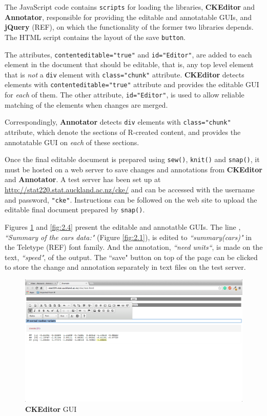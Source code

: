 \documentclass[a4paper, 12pt]{report}
\begin{document}
The JavaScript code contains \texttt{scripts} for loading the libraries, \textbf{CKEditor} and \textbf{Annotator}, responsible for providing the editable and annotatable GUIs, and \textbf{jQuery} (REF), on which the functionality of the former two libraries depends. The HTML script contains the layout of the save \texttt{button}.

The attributes, \texttt{contenteditable="true"} and \texttt{id="Editor"}, are added to each element in the document that should be editable, that is, any top level element that is \emph{not} a \texttt{div} element with \texttt{class="chunk"} attribute. \textbf{CKEditor} detects elements with \texttt{contenteditable="true"} attribute and provides the editable GUI for \emph{each} of them. The other attribute, \texttt{id="Editor"}, is used to allow reliable matching of the elements when changes are merged.

Correspondingly, \textbf{Annotator} detects \texttt{div} elements with \texttt{class="chunk"} attribute, which denote the sections of R-created content, and provides the annotatable GUI on \emph{each} of these sections.

Once the final editable document is prepared using \texttt{sew()}, \texttt{knit()} and \texttt{snap()}, it must be hosted on a web server to save changes and annotations from \textbf{CKEditor} and \textbf{Annotator}. A test server has been set up at \url{http://stat220.stat.auckland.ac.nz/cke/} and can be accessed with the username and password, \texttt{"cke"}. Instructions can be followed on the web site to upload the editable final document prepared by \texttt{snap()}.

Figures \ref{fig:2.3} and \ref{fig:2.4} present the editable and annotatble GUIs. The line , \emph{``Summary of the cars data:"} (Figure \ref{fig:2.1}), is edited to \emph{``summary(cars)"} in the Teletype (REF) font family. And the annotation, \emph{``need units``}, is made on the text, \emph{``speed"}, of the output. The ``save" button on top of the page can be clicked to store the change and annotation separately in text files on the test server.
\begin{figure}[h]  %
\includegraphics[trim=0cm 14cm 3cm 3.5cm,clip=true,width=1\textwidth,center]{changes}
\caption{\textbf{CKEditor} GUI}
\label{fig:2.3}
\end{figure}
\end{document}

